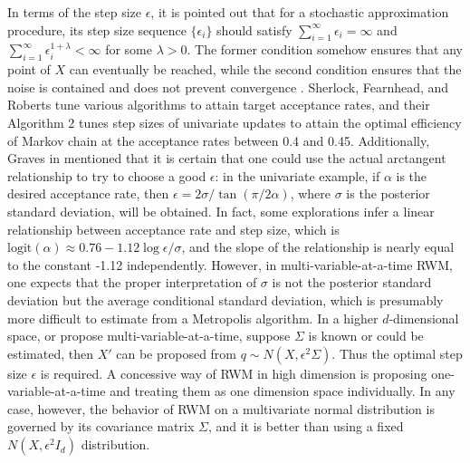In terms of the step size $\epsilon$, it is pointed out that for a stochastic approximation procedure, its step size sequence $\{\epsilon_i\}$ should satisfy $\sum_{i=1}^\infty \epsilon_i=\infty $ and $\sum_{i=1}^\infty \epsilon_i^{1+\lambda}<\infty $ for some $\lambda>0$. The former condition somehow ensures that any point of $X$ can eventually be reached, while the second condition ensures that the noise is contained and does not prevent convergence \cite{andrieu2008tutorial}. Sherlock, Fearnhead, and Roberts \cite{sherlock2010random} tune various algorithms to attain target acceptance rates, and their Algorithm 2 tunes step sizes of univariate updates to attain the optimal efficiency of Markov chain at the acceptance rates between 0.4 and 0.45. Additionally, Graves in \cite{graves2011automatic} mentioned that it is certain that one could use the actual arctangent relationship to try to choose a good $\epsilon$: in the univariate example, if $\alpha$ is the desired acceptance rate, then $\epsilon = 2\sigma / \tan (\pi/2\alpha)$, where $\sigma$ is the posterior standard deviation, will be obtained. In fact, some explorations infer a linear relationship between acceptance rate and step size, which is $\mbox{logit}(\alpha) \approx 0.76-1.12\log \epsilon/\sigma$, and the slope of the relationship is nearly equal to the constant -1.12 independently. However, in multi-variable-at-a-time RWM, one expects that the proper interpretation of $\sigma$ is not the posterior standard deviation but the average conditional standard deviation, which is presumably more difficult to estimate from a Metropolis algorithm. In a higher $d$-dimensional space, or propose multi-variable-at-a-time, suppose $\Sigma$ is known or could be estimated, then $X'$ can be proposed from $q\sim N(X,\epsilon^2\Sigma)$. Thus the optimal step size $\epsilon$ is required. A concessive way of RWM in high dimension is proposing one-variable-at-a-time and treating them as one dimension space individually. In any case, however, the behavior of RWM on a multivariate normal distribution is governed by its covariance matrix $\Sigma$, and it is better than using a fixed $N(X,\epsilon^2I_d)$ distribution\cite{roberts2001optimal}.


